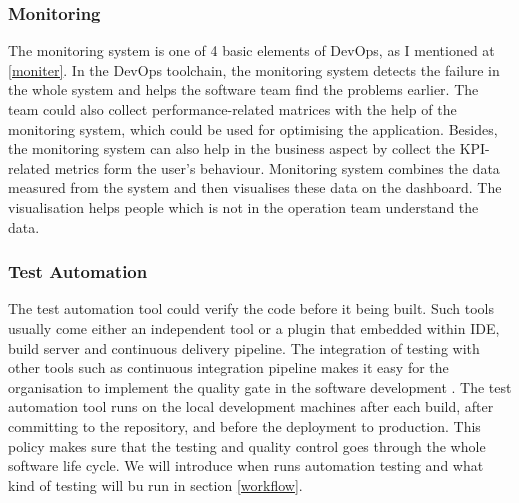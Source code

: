 \subsubsection{Monitoring}
The monitoring system is one of 4 basic elements of DevOps, as I mentioned at \ref{moniter}. In the DevOps toolchain, the monitoring system detects the failure in the whole system and helps the software team find the problems earlier. The team could also collect performance-related matrices with the help of the monitoring system, which could be used for optimising the application. Besides, the monitoring system can also help in the business aspect by collect the KPI-related metrics form the user's behaviour. Monitoring system combines the data measured from the system and then visualises these data on the dashboard. The visualisation helps people which is not in the operation team understand the data.
\subsubsection{Test Automation}
The test automation tool could verify the code before it being built. Such tools usually come either an independent tool or a plugin that embedded within IDE, build server and continuous delivery pipeline. The integration of testing with other tools such as continuous integration pipeline makes it easy for the organisation to implement the quality gate in the software development \cite{huttermann2012devops}.
The test automation tool runs on the local development machines after each build, after committing to the repository, and before the deployment to production. This policy makes sure that the testing and quality control goes through the whole software life cycle. We will introduce when runs automation testing and what kind of testing will bu run in section \ref{workflow}. 

